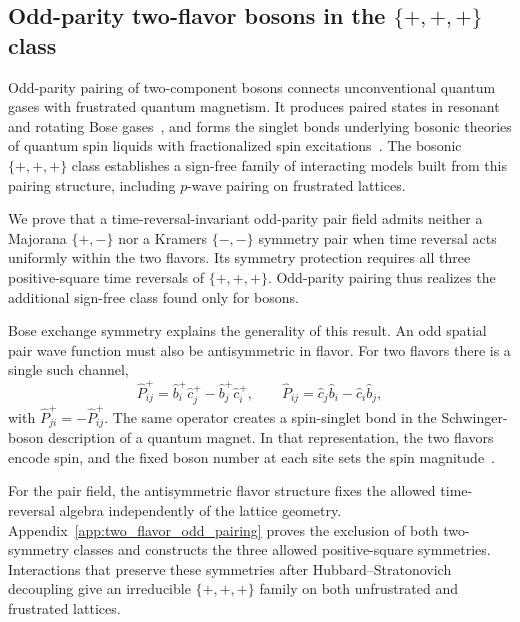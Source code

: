 \documentclass[onecolumn,aps,prb,amsmath,amssymb,superscriptaddress,longbibliography]{revtex4-2}
\begin{document}
\subsection{Odd-parity two-flavor bosons in the \texorpdfstring{\(\{+,+,+\}\)}{\{+,+,+\}} class}
\label{sec:odd_parity_two_flavor_bosons}

Odd-parity pairing of two-component bosons connects unconventional quantum gases with frustrated quantum magnetism.  It produces paired states in resonant and rotating Bose gases~\cite{radzihovskyChoi2009pwave,papenbrockReimannKavoulakis2012pwave}, and forms the singlet bonds underlying bosonic theories of quantum spin liquids with fractionalized spin excitations~\cite{readSachdev1991frustrated,sachdev1992kagome,balents2010}.  The bosonic \(\{+,+,+\}\) class establishes a sign-free family of interacting models built from this pairing structure, including \(p\)-wave pairing on frustrated lattices.

We prove that a time-reversal-invariant odd-parity pair field admits neither a Majorana \(\{+,-\}\) nor a Kramers \(\{-,-\}\) symmetry pair when time reversal acts uniformly within the two flavors.  Its symmetry protection requires all three positive-square time reversals of \(\{+,+,+\}\).  Odd-parity pairing thus realizes the additional sign-free class found only for bosons.

Bose exchange symmetry explains the generality of this result.  An odd spatial pair wave function must also be antisymmetric in flavor.  For two flavors there is a single such channel,
\begin{equation}
    \hat P_{ij}^+=\hat b_i^+\hat c_j^+-\hat b_j^+\hat c_i^+,
    \qquad \hat P_{ij}=\hat c_j\hat b_i-\hat c_i\hat b_j,
    \label{eq:odd_pair}
\end{equation}
with \(\hat P_{ji}^+=-\hat P_{ij}^+\).  The same operator creates a spin-singlet bond in the Schwinger-boson description of a quantum magnet.  In that representation, the two flavors encode spin, and the fixed boson number at each site sets the spin magnitude~\cite{readSachdev1991frustrated,sachdev1992kagome}.

For the pair field, the antisymmetric flavor structure fixes the allowed time-reversal algebra independently of the lattice geometry.  Appendix~\ref{app:two_flavor_odd_pairing} proves the exclusion of both two-symmetry classes and constructs the three allowed positive-square symmetries.  Interactions that preserve these symmetries after Hubbard--Stratonovich decoupling give an irreducible \(\{+,+,+\}\) family on both unfrustrated and frustrated lattices.
\end{document}
